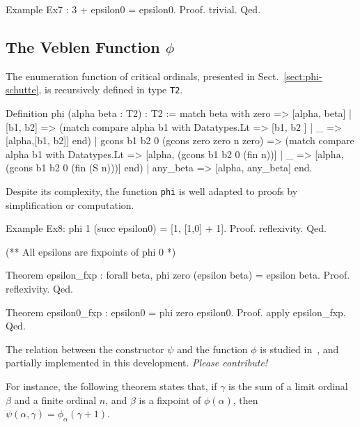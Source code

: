 {\begin{Coqsrc}
Example Ex7 : 3 + epsilon0 = epsilon0.
Proof. trivial. Qed.
\end{Coqsrc}

\subsection{The Veblen Function \texorpdfstring{$\phi$}{\texttt{phi}}}

The enumeration function of critical ordinals, presented in Sect.~\vref{sect:phi-schutte}, is recursively defined in type \texttt{T2}.

\begin{Coqsrc}
Definition  phi (alpha beta : T2) : T2 :=
  match beta with zero => [alpha, beta] 
             | [b1, b2] => 
               (match compare alpha b1
                with Datatypes.Lt => [b1, b2 ]
                | _ => [alpha,[b1, b2]]
                end)
             | gcons b1 b2 0 (gcons zero zero  n zero) => 
               (match compare alpha b1
                with  Datatypes.Lt => 
                      [alpha, (gcons b1 b2 0 (fin n))]
                | _ =>  [alpha, (gcons b1 b2 0 (fin (S n)))]
                end)
             | any_beta => [alpha, any_beta]
  end.
\end{Coqsrc}

Despite its complexity, the function \texttt{phi} is well adapted to proofs by simplification or computation.
\begin{Coqsrc}
Example Ex8:  phi 1 (succ epsilon0) = [1, [1,0] + 1].
Proof. reflexivity. Qed.
\end{Coqsrc}

\begin{Coqsrc}
(**  All epsilons are fixpoints of phi 0 *)

Theorem epsilon_fxp : forall beta, phi zero (epsilon beta) =
                                   epsilon beta.
Proof. reflexivity. Qed.

Theorem epsilon0_fxp : epsilon0 = phi zero epsilon0.
Proof. apply epsilon_fxp. Qed.
\end{Coqsrc}


The relation between the constructor $\psi$ and the function $\phi$ is
studied in~\cite{schutte}, and partially implemented in this development.
\emph{Please contribute!}
 
For instance, the following theorem states that, if $\gamma$ is the sum of a limit ordinal $\beta$ and a finite ordinal $n$, and $\beta$ is a fixpoint of
$\phi(\alpha)$, then $\psi(\alpha,\gamma)=\phi_\alpha(\gamma+1)$.

}

